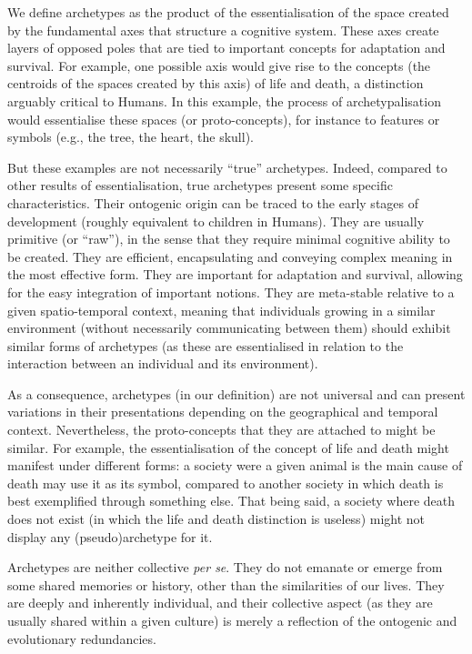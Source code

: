 \documentclass[
]{book}
\begin{document}
We define archetypes as the product of the essentialisation of the space created by the fundamental axes that structure a cognitive system. These axes create layers of opposed poles that are tied to important concepts for adaptation and survival. For example, one possible axis would give rise to the concepts (the centroids of the spaces created by this axis) of life and death, a distinction arguably critical to Humans. In this example, the process of archetypalisation would essentialise these spaces (or proto-concepts), for instance to features or symbols (e.g., the tree, the heart, the skull).

But these examples are not necessarily ``true'' archetypes. Indeed, compared to other results of essentialisation, true archetypes present some specific characteristics. Their ontogenic origin can be traced to the early stages of development (roughly equivalent to children in Humans). They are usually primitive (or ``raw''), in the sense that they require minimal cognitive ability to be created. They are efficient, encapsulating and conveying complex meaning in the most effective form. They are important for adaptation and survival, allowing for the easy integration of important notions. They are meta-stable relative to a given spatio-temporal context, meaning that individuals growing in a similar environment (without necessarily communicating between them) should exhibit similar forms of archetypes (as these are essentialised in relation to the interaction between an individual and its environment).

As a consequence, archetypes (in our definition) are not universal and can present variations in their presentations depending on the geographical and temporal context. Nevertheless, the proto-concepts that they are attached to might be similar. For example, the essentialisation of the concept of life and death might manifest under different forms: a society were a given animal is the main cause of death may use it as its symbol, compared to another society in which death is best exemplified through something else. That being said, a society where death does not exist (in which the life and death distinction is useless) might not display any (pseudo)archetype for it.

Archetypes are neither collective \emph{per se}. They do not emanate or emerge from some shared memories or history, other than the similarities of our lives. They are deeply and inherently individual, and their collective aspect (as they are usually shared within a given culture) is merely a reflection of the ontogenic and evolutionary redundancies.
\end{document}
